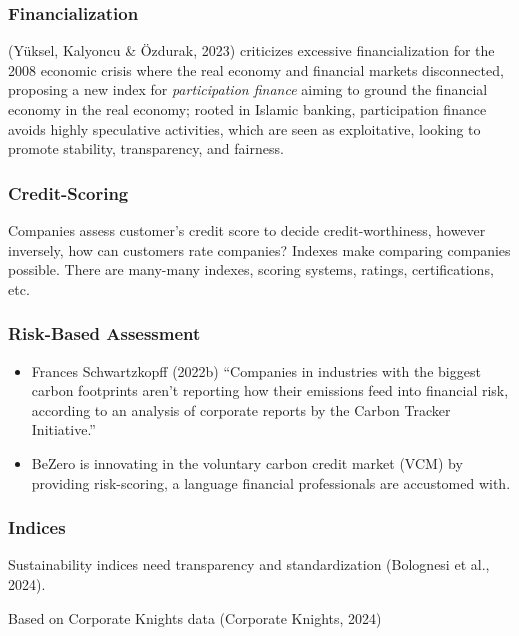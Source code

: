 \documentclass[
  letterpaper,
  DIV=11,
  numbers=noendperiod]{scrartcl}
\begin{document}
\subsubsection{Financialization}\label{financialization}

(Yüksel, Kalyoncu \& Özdurak, 2023) criticizes excessive
financialization for the 2008 economic crisis where the real economy and
financial markets disconnected, proposing a new index for
\emph{participation finance} aiming to ground the financial economy in
the real economy; rooted in Islamic banking, participation finance
avoids highly speculative activities, which are seen as exploitative,
looking to promote stability, transparency, and fairness.

\subsubsection{Credit-Scoring}\label{credit-scoring}

Companies assess customer's credit score to decide credit-worthiness,
however inversely, how can customers rate companies? Indexes make
comparing companies possible. There are many-many indexes, scoring
systems, ratings, certifications, etc.

\subsubsection{Risk-Based Assessment}\label{risk-based-assessment}

\begin{itemize}
\item
  Frances Schwartzkopff (2022b) ``Companies in industries with the
  biggest carbon footprints aren't reporting how their emissions feed
  into financial risk, according to an analysis of corporate reports by
  the Carbon Tracker Initiative.''
\item
  BeZero is innovating in the voluntary carbon credit market (VCM) by
  providing risk-scoring, a language financial professionals are
  accustomed with.
\end{itemize}

\subsubsection{Indices}\label{indices}

Sustainability indices need transparency and standardization (Bolognesi
et al., 2024).

Based on Corporate Knights data (Corporate Knights, 2024)
\end{document}
